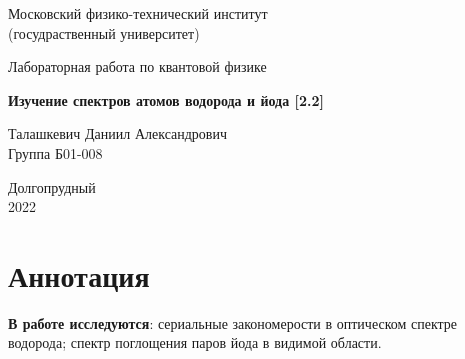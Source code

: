 \documentclass[a4paper, 12pt]{article}%
\begin{document}


\begin{titlepage}

	\newpage
	\begin{center}
		\normalsize Московский физико-технический институт \\(госудраственный 			университет)
	\end{center}

	\vspace{6em}

	\begin{center}
		\Large Лабораторная работа по квантовой физике\\
	\end{center}

	\vspace{1em}

	\begin{center}
		\large \textbf{Изучение спектров атомов водорода и йода  [2.2]}
	\end{center}

	\vspace{2em}

	\begin{center}
		\large Талашкевич Даниил Александрович\\
		Группа Б01-008
	\end{center}

	\vspace{\fill}

	\begin{center}
	Долгопрудный \\2022
	\end{center}
	
\end{titlepage}



	\thispagestyle{empty}
	\newpage
	\tableofcontents
	\newpage
	\setcounter{page}{1}





\section{Аннотация}

\textbf{В работе исследуются}: сериальные закономерости в оптическом спектре водорода; спектр поглощения паров йода в видимой области.
\end{document}
